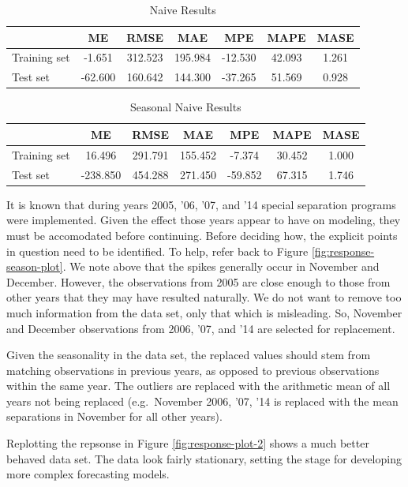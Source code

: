 \documentclass[12pt,letterpaper,toc=flat,oneside]{report}
\theoremstyle{definition}
\theoremstyle{definition}
\theoremstyle{definition}
\theoremstyle{remark}
\begin{document}
\begin{table}

\caption{\label{tab:n-err}Naive Results}
\centering
\begin{tabular}[t]{l|c|c|c|c|c|c}
\hline
  & ME & RMSE & MAE & MPE & MAPE & MASE\\
\hline
Training set & -1.651 & 312.523 & 195.984 & -12.530 & 42.093 & 1.261\\
\hline
Test set & -62.600 & 160.642 & 144.300 & -37.265 & 51.569 & 0.928\\
\hline
\end{tabular}
\end{table}\begin{table}

\caption{\label{tab:sn-err}Seasonal Naive Results}
\centering
\begin{tabular}[t]{l|c|c|c|c|c|c}
\hline
  & ME & RMSE & MAE & MPE & MAPE & MASE\\
\hline
Training set & 16.496 & 291.791 & 155.452 & -7.374 & 30.452 & 1.000\\
\hline
Test set & -238.850 & 454.288 & 271.450 & -59.852 & 67.315 & 1.746\\
\hline
\end{tabular}
\end{table}

It is known that during years 2005, '06, '07, and '14 special separation
programs were implemented. Given the effect those years appear to have
on modeling, they must be accomodated before continuing. Before deciding
how, the explicit points in question need to be identified. To help,
refer back to Figure \ref{fig:response-season-plot}. We note above that
the spikes generally occur in November and December. However, the
observations from 2005 are close enough to those from other years that
they may have resulted naturally. We do not want to remove too much
information from the data set, only that which is misleading. So,
November and December observations from 2006, '07, and '14 are selected
for replacement.

Given the seasonality in the data set, the replaced values should stem
from matching observations in previous years, as opposed to previous
observations within the same year. The outliers are replaced with the
arithmetic mean of all years not being replaced (e.g.~November 2006,
'07, '14 is replaced with the mean separations in November for all other
years).

Replotting the repsonse in Figure \ref{fig:response-plot-2} shows a much
better behaved data set. The data look fairly stationary, setting the
stage for developing more complex forecasting models.
\end{document}

